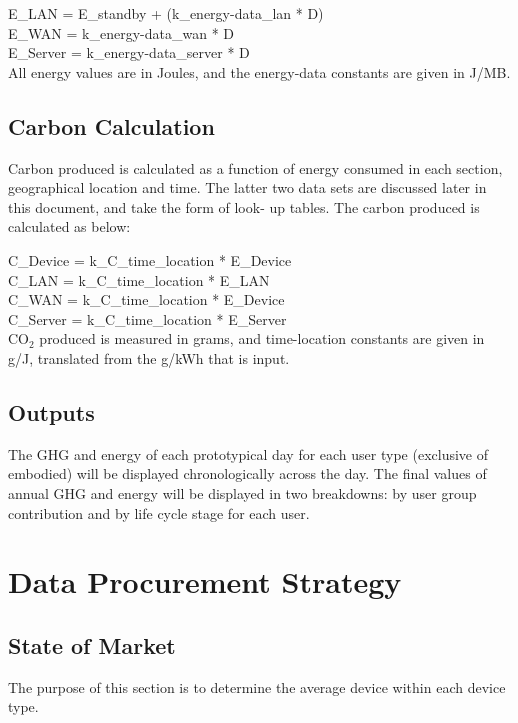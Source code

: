 \documentclass[conference]{IEEEtran}
\begin{document}
E\_LAN = E\_standby + (k\_energy-data\_lan * D)\\
E\_WAN = k\_energy-data\_wan * D\\
E\_Server = k\_energy-data\_server * D\\

All energy values are in Joules, and the energy-data constants are given in J/MB.

\subsection{Carbon Calculation}

Carbon produced is calculated as a function of energy consumed in each
section, geographical location and time. The latter two data sets are
discussed later in this document, and take the form of look- up
tables. The carbon produced is calculated as below:

C\_Device = k\_C\_time\_location * E\_Device\\
C\_LAN = k\_C\_time\_location * E\_LAN\\
C\_WAN = k\_C\_time\_location * E\_Device\\
C\_Server = k\_C\_time\_location * E\_Server\\

CO$_2$ produced is measured in grams, and time-location constants are
given in g/J, translated from the g/kWh that is input.

\subsection{Outputs}

The GHG and energy of each prototypical day for each user type
(exclusive of embodied) will be displayed chronologically across the
day. The final values of annual GHG and energy will be displayed in two
breakdowns: by user group contribution and by life cycle stage for
each user.


\section{Data Procurement Strategy}

\subsection{State of Market}

The purpose of this section is to determine the average device within
each device type.
\end{document}
